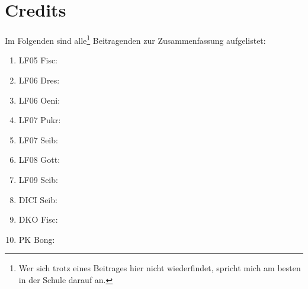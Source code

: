 \section{Credits}
Im Folgenden sind alle\footnote{Wer sich trotz eines Beitrages hier nicht wiederfindet, spricht mich am besten in der Schule darauf an.} Beitragenden zur Zusammenfassung aufgelistet:

\begin{enumerate}
	\item LF05 Fisc: \\
	\item LF06 Dres: \\
	\item LF06 Oeni: \\
	\item LF07 Pukr: \\
	\item LF07 Seib: \\
	\item LF08 Gott: \\
	\item LF09 Seib: \\
	\item DICI Seib: \\
	\item DKO Fisc: \\
	\item PK Bong: \\
\end{enumerate}
